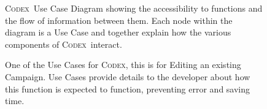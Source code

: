 \documentclass[progress]{cmpreport}
\newcommand{\Codex}{\textsc{Codex}}
\begin{document}
		\begin{figure}[h]
			\centering
			\caption{\Codex \ Use Case Diagram showing the accessibility to functions and the flow of information between them. Each node within the diagram is a Use Case and together explain how the various components of \Codex \ interact.} \label{fig:use-case-diag}
		\end{figure}
	
		\begin{figure}[h]
			\centering
			\caption{One of the Use Cases for \Codex, this is for Editing an existing Campaign. Use Cases provide details to the developer about how this function is expected to function, preventing error and saving time.}\label{fig:use-case}	
		\end{figure}
	
\end{document}
